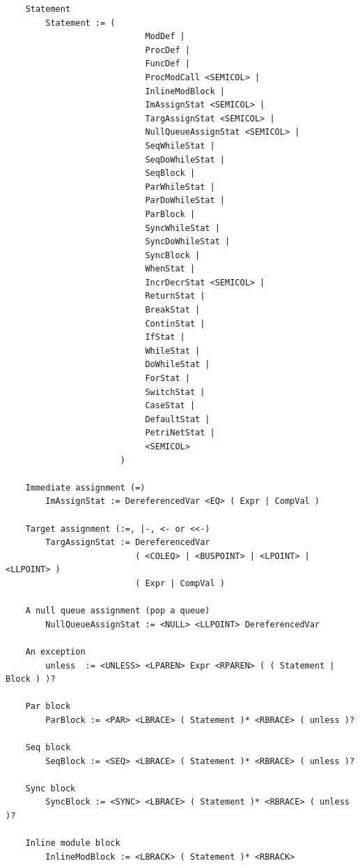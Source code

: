 \begin{verbatim}
    Statement
        Statement := (
                            ModDef |
                            ProcDef |
                            FuncDef |
                            ProcModCall <SEMICOL> |
                            InlineModBlock |
                            ImAssignStat <SEMICOL> |
                            TargAssignStat <SEMICOL> |
                            NullQueueAssignStat <SEMICOL> |
                            SeqWhileStat |
                            SeqDoWhileStat |
                            SeqBlock |
                            ParWhileStat |
                            ParDoWhileStat |
                            ParBlock |
                            SyncWhileStat |
                            SyncDoWhileStat |
                            SyncBlock |
                            WhenStat |
                            IncrDecrStat <SEMICOL> |
                            ReturnStat |
                            BreakStat |
                            ContinStat |
                            IfStat |
                            WhileStat |
                            DoWhileStat |
                            ForStat |
                            SwitchStat |
                            CaseStat |
                            DefaultStat |
                            PetriNetStat |
                            <SEMICOL>
                       )

    Immediate assignment (=)
        ImAssignStat := DereferencedVar <EQ> ( Expr | CompVal )

    Target assignment (:=, |-, <- or <<-)
        TargAssignStat := DereferencedVar
                          ( <COLEQ> | <BUSPOINT> | <LPOINT> | <LLPOINT> )
                          ( Expr | CompVal )

    A null queue assignment (pop a queue)
        NullQueueAssignStat := <NULL> <LLPOINT> DereferencedVar

    An exception
        unless  := <UNLESS> <LPAREN> Expr <RPAREN> ( ( Statement | Block ) )?

    Par block
        ParBlock := <PAR> <LBRACE> ( Statement )* <RBRACE> ( unless )?

    Seq block
        SeqBlock := <SEQ> <LBRACE> ( Statement )* <RBRACE> ( unless )?

    Sync block
        SyncBlock := <SYNC> <LBRACE> ( Statement )* <RBRACE> ( unless )?

    Inline module block
        InlineModBlock := <LBRACK> ( Statement )* <RBRACK>


\end{verbatim}
